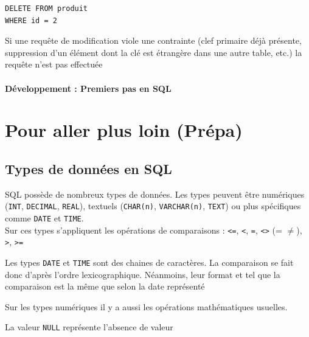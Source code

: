 \begin{example}
	\begin{lstlisting}
DELETE FROM produit
WHERE id = 2
	\end{lstlisting}
\end{example}

\begin{proposition}
	Si une requête de modification viole une contrainte (clef primaire déjà présente, suppression d'un élément dont la clé est étrangère dans une autre table, etc.) la requête n'est pas effectuée
\end{proposition}

\paragraph{Développement : Premiers pas en SQL}

\section{Pour aller plus loin (Prépa)}

\subsection{Types de données en SQL}

SQL possède de nombreux types de données. Les types peuvent être numériques (\texttt{INT}, \texttt{DECIMAL}, \texttt{REAL}), textuels (\texttt{CHAR(n)}, \texttt{VARCHAR(n)}, \texttt{TEXT}) ou plus spécifiques comme \texttt{DATE} et \texttt{TIME}.\\

Sur ces types s'appliquent les opérations de comparaisons : \texttt{<=}, \texttt{<}, \texttt{=}, \texttt{<>} (= $\neq$),  \texttt{>}, \texttt{>=}

\begin{rem}
	Les types \texttt{DATE} et \texttt{TIME} sont des chaines de caractères. La comparaison se fait donc d'après l'ordre lexicographique. Néanmoins, leur format et tel que la comparaison est la même que selon la date représenté
\end{rem}

\begin{rem}
	Sur les types numériques il y a aussi les opérations mathématiques usuelles.
\end{rem}

\begin{definition}
	La valeur \texttt{NULL} représente l'absence de valeur
\end{definition}

